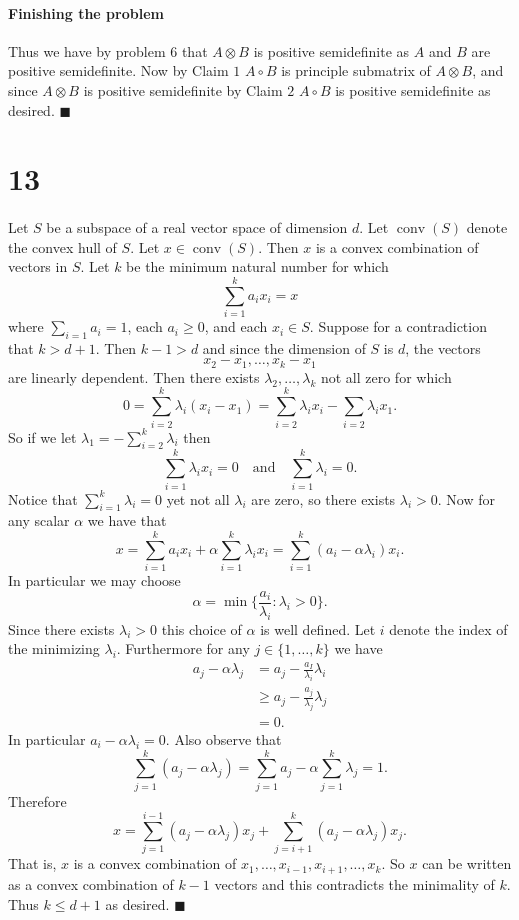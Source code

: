 \documentclass[letterpaper,12pt,oneside,onecolumn]{article}
\DeclareMathOperator{\conv}{conv}
\begin{document}
\paragraph{Finishing the problem}
Thus we have by problem $6$ that $A \otimes B$ is positive semidefinite as $A$ and $B$ are positive semidefinite. Now by Claim $1$ $A \circ B$ is principle submatrix of $A\otimes B$, and since $A \otimes B$ is positive semidefinite by Claim $2$ $A \circ B$ is positive semidefinite as desired. $\blacksquare$
\section*{13}
\paragraph{}
Let $S$ be a subspace of a real vector space of dimension $d$. Let $\conv(S)$ denote the convex hull of $S$. Let $x \in \conv(S)$. Then $x$ is a convex combination of vectors in $S$. Let $k$ be the minimum natural number for which
$$\sum_{i=1}^k a_i x_i = x$$
where $\sum_{i=1}a_i = 1$, each $a_i \geq 0$, and each $x_i \in S$. Suppose for a contradiction that $k > d+1$. Then $k-1 >d$ and since the dimension of $S$ is $d$, the vectors
$$x_2 - x_1, \dots, x_k -x_1$$
are linearly dependent. Then there exists $\lambda_2, \dots, \lambda_k$ not all zero for which
$$0 = \sum_{i=2}^k \lambda_i (x_i-x_1) = \sum_{i=2}^k \lambda_i x_i - \sum_{i=2}\lambda_i x_1.$$
So if we let $\lambda_1 = -\sum_{i=2}^k\lambda_i$ then
$$ \sum_{i=1}^k \lambda_i x_i = 0 \quad\text{and}\quad \sum_{i=1}^k \lambda_i = 0.$$
Notice that $\sum_{i=1}^k \lambda_i = 0$ yet not all $\lambda_i$ are zero, so there exists $\lambda_i >0$. Now for any scalar $\alpha$ we have that
$$x = \sum_{i=1}^k a_i x_i + \alpha \sum_{i=1}^k \lambda_i x_i = \sum_{i=1}^k (a_i - \alpha\lambda_i)x_i.$$
In particular we may choose
$$\alpha = \min\{\frac{a_i}{\lambda_i} : \lambda_i >0\}.$$
Since there exists $\lambda_i >0$ this choice of $\alpha$ is well defined. Let $i$ denote the index of the minimizing $\lambda_i$. Furthermore for any $j \in \{1, \dots, k\}$ we have
\begin{align*}
a_j - \alpha \lambda_j &= a_j - \frac{a_I}{\lambda_i} \lambda_i \\
&\geq a_j - \frac{a_j}{\lambda_j}\lambda_j \\
&= 0.
\end{align*}
In particular $a_i - \alpha \lambda_i = 0$. Also observe that $$\sum_{j=1}^k (a_j - \alpha \lambda_j) = \sum_{j=1}^k a_j - \alpha \sum_{j=1}^k \lambda_j = 1.$$
Therefore $$x = \sum_{j=1}^{i-1} (a_j - \alpha \lambda_j)x_j + \sum_{j=i+1}^{k} (a_j - \alpha \lambda_j)x_j.$$
That is, $x$ is a convex combination of $x_1, \dots, x_{i-1}, x_{i+1}, \dots, x_k$. So $x$ can be written as a convex combination of $k-1$ vectors and this contradicts the minimality of $k$. Thus $k \leq d+1$ as desired. $\blacksquare$
\end{document}
